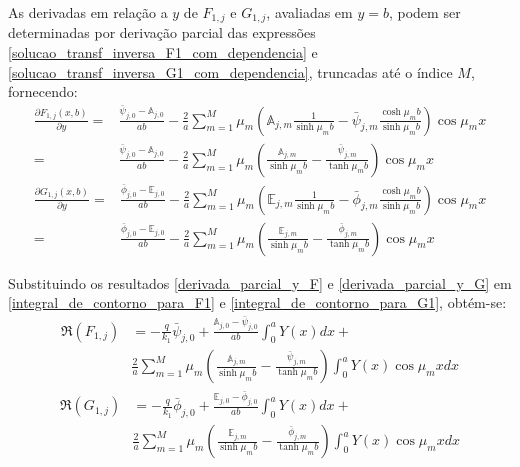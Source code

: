 As derivadas em relação a $y$ de $F_{1,j}$ e $G_{1,j}$, avaliadas em $y = b$, podem ser determinadas por derivação parcial das expressões \eqref{solucao_transf_inversa_F1_com_dependencia} e
\eqref{solucao_transf_inversa_G1_com_dependencia}, truncadas até o índice $M$, fornecendo:
%
\begin{align}
\frac{\partial F_{1, j}(x, b)}{\partial y} = & \frac{\bar{\psi}_{j,0} - \mathbb{A}_{j,0}}{ab} - 
\frac{2}{a}\sum_{m=1}^M \mu_m \left(\mathbb{A}_{j,m}\frac{1}{\sinh\mu_m b} - \bar{\psi}_{j, m}\frac{\cosh\mu_m b}{\sinh\mu_m b}\right)\cos\mu_m x \nonumber \\
= & \frac{\bar{\psi}_{j,0} - \mathbb{A}_{j,0}}{ab} - 
\frac{2}{a}\sum_{m=1}^M \mu_m \left(\frac{\mathbb{A}_{j,m}}{\sinh\mu_m b} - \frac{\bar{\psi}_{j, m}}{\tanh\mu_m b}\right)\cos\mu_m x
\label{derivada_parcial_y_F}
\end{align}
%
\begin{align}
\frac{\partial G_{1, j}(x, b)}{\partial y} = & \frac{\bar{\phi}_{j,0} - \mathbb{E}_{j,0}}{ab} - 
\frac{2}{a}\sum_{m=1}^M \mu_m \left(\mathbb{E}_{j,m}\frac{1}{\sinh\mu_m b} - \bar{\phi}_{j, m}\frac{\cosh\mu_m b}{\sinh\mu_m b}\right)\cos\mu_m x \nonumber \\
= & \frac{\bar{\phi}_{j,0} - \mathbb{E}_{j,0}}{ab} - 
\frac{2}{a}\sum_{m=1}^M \mu_m \left(\frac{\mathbb{E}_{j,m}}{\sinh\mu_m b} - \frac{\bar{\phi}_{j, m}}{\tanh\mu_m b}\right)\cos\mu_m x
\label{derivada_parcial_y_G}
\end{align}

Substituindo os resultados \eqref{derivada_parcial_y_F} e \eqref{derivada_parcial_y_G} em \eqref{integral_de_contorno_para_F1} e \eqref{integral_de_contorno_para_G1}, obtém-se:
\begin{align}
\Re(F_{1,j})
& =
-\frac{q}{k_1}\bar{\psi}_{j,0} + \frac{\mathbb{A}_{j,0} - \bar{\psi}_{j,0}}{ab}\int_0^a Y(x)dx + \nonumber \\
& \frac{2}{a}\sum_{m=1}^M \mu_m \left(\frac{\mathbb{A}_{j,m}}{\sinh\mu_m b} - \frac{\bar{\psi}_{j, m}}{\tanh\mu_m b}\right)\int_0^a Y(x)\cos\mu_m x dx
\label{calculo_FR_F1}
\end{align}
%
\begin{align}
\Re(G_{1,j})
& =
-\frac{q}{k_1}\bar{\phi}_{j,0} + \frac{\mathbb{E}_{j,0} - \bar{\phi}_{j,0}}{ab}\int_0^a Y(x)dx + \nonumber \\
& \frac{2}{a}\sum_{m=1}^M \mu_m \left(\frac{\mathbb{E}_{j,m}}{\sinh\mu_m b} - \frac{\bar{\phi}_{j, m}}{\tanh\mu_m b}\right)\int_0^a Y(x)\cos\mu_m x dx
\label{calculo_FR_G1}
\end{align}

